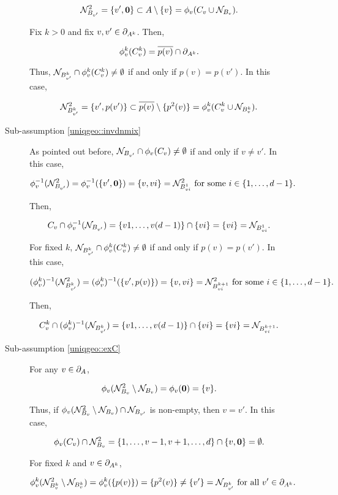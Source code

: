 \begin{description}
\begin{description}
\[\mathcal{N}^2_{B_{v'}} = \{v',\mathbf{0}\} \subset A\setminus\{v\} = \phi_v(C_v\cup\mathcal{N}_{B_v}).\]

Fix \(k>0\) and fix \(v,v'\in\partial_{A^{k}}\). Then,

\[\phi^{k}_v(C^{k}_v) = \overline{p(v)}\cap\partial_{A^{k}}.\]

Thus, \(\mathcal{N}_{B^{k}_{v'}}\cap\phi^{k}_v(C^{k}_v) \neq \emptyset\) if and only if \(p(v) = p(v')\). In this case,

\[\mathcal{N}^2_{B^{k}_{v'}} = \{v',p(v')\} \subset \overline{p(v)}\setminus \{p^2(v)\} = \phi^{k}_v(C^{k}_v\cup\mathcal{N}_{B^{k}_v}).\]

\item[Sub-assumption \ref{uniqgeo::invdnmix}] As pointed out before, \(\mathcal{N}_{B_{v'}} \cap \phi_v(C_v) \neq \emptyset\) if and only if \(v \neq v'\). In this case, 

\[\phi_v^{-1}(\mathcal{N}^2_{B_{v'}}) =  \phi_v^{-1}(\{v',\mathbf{0}\}) = \{v,vi\}= \mathcal{N}^2_{B^{1}_{vi}}\text{ for some } i \in \{1,\dots,d-1\}.\]

Then,

\[C_v\cap\phi_v^{-1}(\mathcal{N}_{B_{v'}}) = \{v1,\dots,v(d-1)\}\cap\{vi\} = \{vi\} = \mathcal{N}_{B^{1}_{vi}}.\]

For fixed \(k\), \(\mathcal{N}_{B^{k}_{v'}} \cap \phi^{k}_v(C^{k}_v) \neq \emptyset\) if and only if \(p(v) = p(v')\). In this case,

\[(\phi^{k}_v)^{-1}(\mathcal{N}^2_{B^{k}_{v'}}) = (\phi^{k}_v)^{-1}(\{v',p(v)\}) = \{v,vi\} = \mathcal{N}^2_{B^{k+1}_{vi}}\text{ for some } i \in \{1,\dots,d-1\}.\]

Then,

\[C^{k}_v\cap(\phi^{k}_v)^{-1}(\mathcal{N}_{B^{k}_{v'}}) = \{v1,\dots,v(d-1)\}\cap\{vi\} = \{vi\} = \mathcal{N}_{B^{k+1}_{vi}}.\]

\item[Sub-assumption \ref{uniqgeo::exC}] For any \(v \in \partial_{A}\),

\[\phi_v(\mathcal{N}^2_{B_v}\setminus \mathcal{N}_{B_v}) = \phi_v(\mathbf{0}) = \{v\}.\]

Thus, if \(\phi_v(\mathcal{N}^2_{B_v}\setminus \mathcal{N}_{B_v})\cap\mathcal{N}_{B_{v'}}\) is non-empty, then \(v = v'\). In this case,

\[\phi_v(C_v)\cap\mathcal{N}^2_{B_v} = \{1,\dots,v-1,v+1,\dots,d\}\cap \{v,\mathbf{0}\} = \emptyset.\]

For fixed \(k\) and \(v \in \partial_{A^{k}}\),

\[\phi^{k}_v(\mathcal{N}^2_{B^{k}_v}\setminus \mathcal{N}_{B^{k}_v}) = \phi^{k}_v(\{p(v)\}) = \{p^2(v)\} \neq \{v'\} = \mathcal{N}_{B^{k}_{v'}}\text{ for all }v'\in\partial_{A^{k}}.\]


\end{description}
\end{description}
